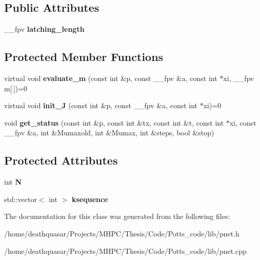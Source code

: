 \subsection*{Public Attributes}
\begin{DoxyCompactItemize}
\item 
\+\_\+\+\_\+fpv {\bfseries latching\+\_\+length}\hypertarget{classPNet_ac21a9a2f6de2fc6094bdfacc78142ffe}{}\label{classPNet_ac21a9a2f6de2fc6094bdfacc78142ffe}

\end{DoxyCompactItemize}
\subsection*{Protected Member Functions}
\begin{DoxyCompactItemize}
\item 
virtual void {\bfseries evaluate\+\_\+m} (const int \&p, const \+\_\+\+\_\+fpv \&a, const int $\ast$xi, \+\_\+\+\_\+fpv m\mbox{[}$\,$\mbox{]})=0\hypertarget{classPNet_a6d519b171b571fccbc1d263ff40822e3}{}\label{classPNet_a6d519b171b571fccbc1d263ff40822e3}

\item 
virtual void {\bfseries init\+\_\+J} (const int \&p, const \+\_\+\+\_\+fpv \&a, const int $\ast$xi)=0\hypertarget{classPNet_aeef297a15dc839818cd560228c9b8236}{}\label{classPNet_aeef297a15dc839818cd560228c9b8236}

\item 
void {\bfseries get\+\_\+status} (const int \&p, const int \&tx, const int \&t, const int $\ast$xi, const \+\_\+\+\_\+fpv \&a, int \&Mumaxold, int \&Mumax, int \&steps, bool \&stop)\hypertarget{classPNet_a3c22be54795d659f2ebab3725ad93946}{}\label{classPNet_a3c22be54795d659f2ebab3725ad93946}

\end{DoxyCompactItemize}
\subsection*{Protected Attributes}
\begin{DoxyCompactItemize}
\item 
int {\bfseries N}\hypertarget{classPNet_a165f64c0fb771ebbcb5851b27373cf30}{}\label{classPNet_a165f64c0fb771ebbcb5851b27373cf30}

\item 
std\+::vector$<$ int $>$ {\bfseries ksequence}\hypertarget{classPNet_ab636bd102fd68c5801c1b907dba52e9d}{}\label{classPNet_ab636bd102fd68c5801c1b907dba52e9d}

\end{DoxyCompactItemize}


The documentation for this class was generated from the following files\+:\begin{DoxyCompactItemize}
\item 
/home/deathquasar/\+Projects/\+M\+H\+P\+C/\+Thesis/\+Code/\+Potts\+\_\+code/lib/pnet.\+h\item 
/home/deathquasar/\+Projects/\+M\+H\+P\+C/\+Thesis/\+Code/\+Potts\+\_\+code/lib/pnet.\+cpp\end{DoxyCompactItemize}
